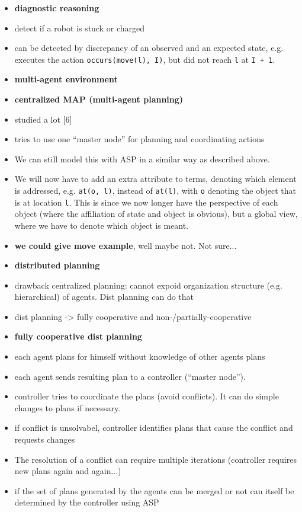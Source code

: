 \documentclass[runningheads]{llncs}
\begin{document}
\begin{itemize}
    \item \textbf{diagnostic reasoning}
    \item detect if a robot is stuck or charged
    \item can be detected by discrepancy of an observed and an expected state, e.g. executes the action \verb|occurs(move(l), I)|, but did not reach \verb|l| at \verb|I + 1|.
    \item \textbf{multi-agent environment}
    \item \textbf{centralized MAP (multi-agent planning)}
    \item studied a lot [6]
    \item tries to use one ``master node'' for planning and coordinating actions
    \item We can still model this with ASP in a similar way as described above. 
    \item We will now have to add an extra attribute to terms, denoting which element is addressed, e.g. \verb|at(o, l)|, instead of \verb|at(l)|, with  \verb|o| denoting the object that is at location  \verb|l|. This is since we now  longer have the perspective of each object (where the affiliation of state and object is obvious), but a global view, where we have to denote which object is meant.
    \item \textbf{we could give move example}, well maybe not. Not sure...
    \item \textbf{distributed planning}
    \item drawback centralized planning: cannot expoid organization structure (e.g. hierarchical) of agents. Dist planning can do that
    \item dist planning -> fully cooperative and non-/partially-cooperative
    \item \textbf{fully cooperative dist planning}
    \item each agent plans for himself without knowledge of other agents plans
    \item each agent sends resulting plan to a controller (``master node''). 
    \item controller tries to coordinate the plans (avoid conflicts). It can do simple changes to plans if necessary. 
    \item if conflict is unsolvabel, controller identifies plans that cause the conflict and requests changes
    \item The resolution of a conflict can require multiple iterations (controller requires new plans again and again...)
    \item if the set of plans generated by the agents can be merged or not can itself be determined by the controller using ASP

\end{itemize}
\end{document}

